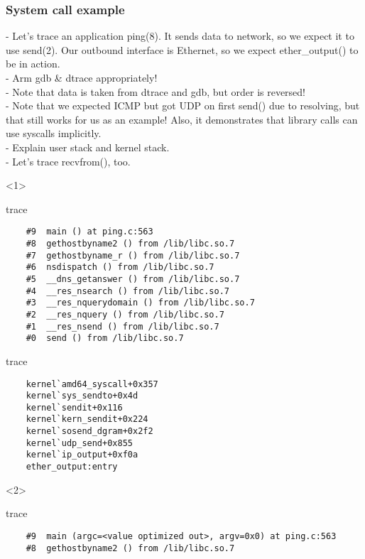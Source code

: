 \documentclass{beamer}
\begin{document}
\begin{frame}[fragile]
\frametitle{System call example}
 {
	- Let's trace an application ping(8). It sends data to network,
	  so we expect it to use send(2). Our outbound interface is Ethernet,
	  so we expect ether\_output() to be in action.\\
	- Arm gdb \& dtrace appropriately!\\
	- Note that data is taken from dtrace and gdb, but order is
	  reversed!\\
	- Note that we expected ICMP but got UDP on first send() due to
	  resolving, but that still works for us as an example! Also, it
	  demonstrates that library calls can use syscalls implicitly.\\
	- Explain user stack and kernel stack.\\
	- Let's trace recvfrom(), too.\\
}
\begin{scriptsize}
\begin{onlyenv}<1>
  \begin{beamercolorbox}[rounded=true,shadow=true,sep=0pt,ht=3.5cm]{trace}
	\begin{verbatim}
	#9  main () at ping.c:563
	#8  gethostbyname2 () from /lib/libc.so.7
	#7  gethostbyname_r () from /lib/libc.so.7
	#6  nsdispatch () from /lib/libc.so.7
	#5  __dns_getanswer () from /lib/libc.so.7
	#4  __res_nsearch () from /lib/libc.so.7
	#3  __res_nquerydomain () from /lib/libc.so.7
	#2  __res_nquery () from /lib/libc.so.7
	#1  __res_nsend () from /lib/libc.so.7
	#0  send () from /lib/libc.so.7
	\end{verbatim}
  \end{beamercolorbox}
  \begin{beamercolorbox}[rounded=true,shadow=true,sep=0pt,ht=3cm]{trace}
	\begin{verbatim}
	kernel`amd64_syscall+0x357
	kernel`sys_sendto+0x4d
	kernel`sendit+0x116
	kernel`kern_sendit+0x224
	kernel`sosend_dgram+0x2f2
	kernel`udp_send+0x855
	kernel`ip_output+0xf0a
	ether_output:entry 
	\end{verbatim}
  \end{beamercolorbox}
\end{onlyenv}
\begin{onlyenv}<2>
  \begin{beamercolorbox}[rounded=true,shadow=true,sep=0pt,ht=3.5cm]{trace}
	\begin{verbatim}
	#9  main (argc=<value optimized out>, argv=0x0) at ping.c:563
	#8  gethostbyname2 () from /lib/libc.so.7

\end{verbatim}
\end{beamercolorbox}
\end{onlyenv}
\end{scriptsize}
\end{frame}
\end{document}
